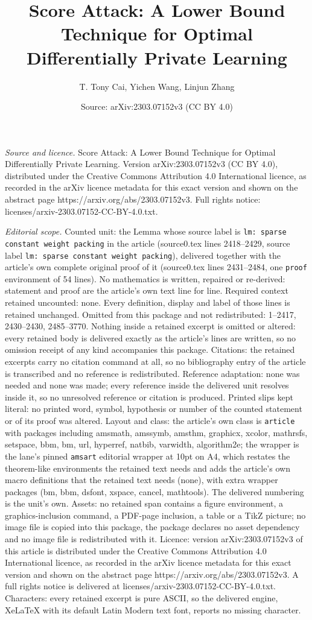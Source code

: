 \documentclass[10pt,a4paper]{amsart}
\title[Score Attack: A Lower Bound Technique for Optimal Differenti]{Score Attack: A Lower Bound Technique for Optimal Differentially Private Learning}
\author{T. Tony Cai, Yichen Wang, Linjun Zhang}
\date{Source: arXiv:2303.07152v3 (CC BY 4.0)}
\begin{document}
\maketitle

\noindent\emph{Source and licence.} Score Attack: A Lower Bound Technique for Optimal Differentially Private Learning. Version arXiv:2303.07152v3 (CC BY 4.0), distributed under the Creative Commons Attribution 4.0 International licence, as recorded in the arXiv licence metadata for this exact version and shown on the abstract page https://arxiv.org/abs/2303.07152v3. Full rights notice: licenses/arxiv-2303.07152-CC-BY-4.0.txt.\par\smallskip

\noindent\textit{Editorial scope.} Counted unit: the Lemma whose source label is \texttt{lm: sparse constant weight packing} in the article (source0.tex lines 2418--2429, source label \texttt{lm: sparse constant weight packing}), delivered together with the article's own complete original proof of it (source0.tex lines 2431--2484, one \texttt{proof} environment of 54 lines). No mathematics is written, repaired or re-derived: statement and proof are the article's own text line for line. Required context retained uncounted: none. Every definition, display and label of those lines is retained unchanged. Omitted from this package and not redistributed: 1--2417, 2430--2430, 2485--3770. Nothing inside a retained excerpt is omitted or altered: every retained body is delivered exactly as the article's lines are written, so no omission receipt of any kind accompanies this package. Citations: the retained excerpts carry no citation command at all, so no bibliography entry of the article is transcribed and no reference is redistributed. Reference adaptation: none was needed and none was made; every reference inside the delivered unit resolves inside it, so no unresolved reference or citation is produced. Printed slips kept literal: no printed word, symbol, hypothesis or number of the counted statement or of its proof was altered. Layout and class: the article's own class is \texttt{article} with packages including amsmath, amssymb, amsthm, graphicx, xcolor, mathrsfs, setspace, bbm, bm, url, hyperref, natbib, varwidth, algorithm2e; the wrapper is the lane's pinned \texttt{amsart} editorial wrapper at 10pt on A4, which restates the theorem-like environments the retained text needs and adds the article's own macro definitions that the retained text needs (none), with extra wrapper packages (bm, bbm, dsfont, xspace, cancel, mathtools). The delivered numbering is the unit's own. Assets: no retained span contains a figure environment, a graphics-inclusion command, a PDF-page inclusion, a table or a TikZ picture; no image file is copied into this package, the package declares no asset dependency and no image file is redistributed with it. Licence: version arXiv:2303.07152v3 of this article is distributed under the Creative Commons Attribution 4.0 International licence, as recorded in the arXiv licence metadata for this exact version and shown on the abstract page https://arxiv.org/abs/2303.07152v3. A full rights notice is delivered at licenses/arxiv-2303.07152-CC-BY-4.0.txt. Characters: every retained excerpt is pure ASCII, so the delivered engine, XeLaTeX with its default Latin Modern text font, reports no missing character.
\end{document}
